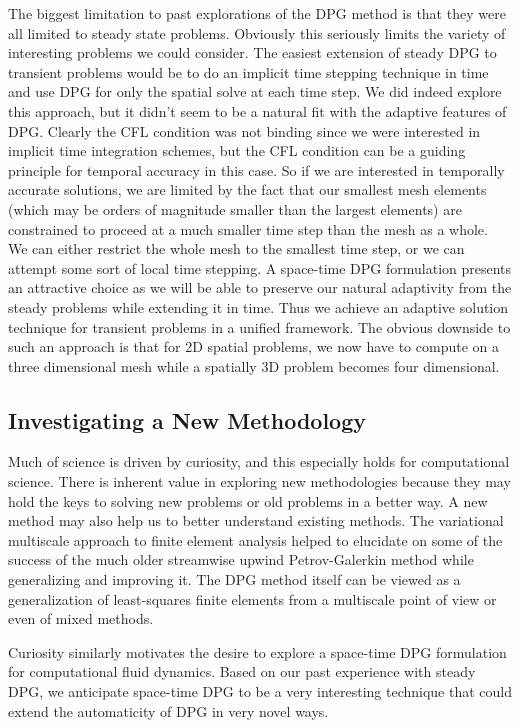 \documentclass[Proposal.tex]{subfiles}
\begin{document}
The biggest limitation to past explorations of the DPG method is that they were all limited to steady state problems.
Obviously this seriously limits the variety of interesting problems we could consider. 
The easiest extension of steady DPG to transient problems would be to do an implicit time stepping technique in time and use DPG for only the spatial solve at each time step.
We did indeed explore this approach, but it didn't seem to be a natural fit with the adaptive features of DPG.
Clearly the CFL condition was not binding since we were interested in implicit time integration schemes, but the CFL condition can be a guiding principle for temporal accuracy in this case.
So if we are interested in temporally accurate solutions, we are limited by the fact that our smallest mesh elements (which may be orders of magnitude smaller than the largest elements) are constrained to proceed at a much smaller time step than the mesh as a whole. 
We can either restrict the whole mesh to the smallest time step, or we can attempt some sort of local time stepping.
A space-time DPG formulation presents an attractive choice as we will be able to preserve our natural adaptivity from the steady problems while extending it in time.
Thus we achieve an adaptive solution technique for transient problems in a unified framework.
The obvious downside to such an approach is that for 2D spatial problems, we now have to compute on a three dimensional mesh while a spatially 3D problem becomes four dimensional.

\subsection{Investigating a New Methodology}
Much of science is driven by curiosity, and this especially holds for computational science. 
There is inherent value in exploring new methodologies because they may hold the keys to solving new problems or old problems in a better way.
A new method may also help us to better understand existing methods. 
The variational multiscale approach to finite element analysis helped to elucidate on some of the success of the much older streamwise upwind Petrov-Galerkin method while generalizing and improving it.
The DPG method itself can be viewed as a generalization of least-squares finite elements 
from a multiscale point of view\cite{DPGMultiscale} or even of mixed methods\cite{DPGMixed}. 

Curiosity similarly motivates the desire to explore a space-time DPG formulation for computational fluid dynamics. 
Based on our past experience with steady DPG, we anticipate space-time DPG to be a very interesting technique that could extend the automaticity of DPG in very novel ways.
\end{document}
